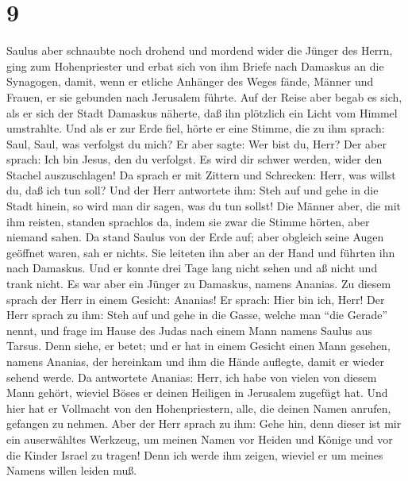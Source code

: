 \hypertarget{section-8}{%
\section{9}\label{section-8}}

 Saulus aber schnaubte noch drohend und mordend wider die
Jünger des Herrn, ging zum Hohenpriester  und erbat sich
von ihm Briefe nach Damaskus an die Synagogen, damit, wenn er etliche
Anhänger des Weges fände, Männer und Frauen, er sie gebunden nach
Jerusalem führte.  Auf der Reise aber begab es sich, als
er sich der Stadt Damaskus näherte, daß ihn plötzlich ein Licht vom
Himmel umstrahlte.  Und als er zur Erde fiel, hörte er
eine Stimme, die zu ihm sprach: Saul, Saul, was verfolgst du mich?
 Er aber sagte: Wer bist du, Herr? Der aber sprach: Ich
bin Jesus, den du verfolgst. Es wird dir schwer werden, wider den
Stachel auszuschlagen!  Da sprach er mit Zittern und
Schrecken: Herr, was willst du, daß ich tun soll? Und der Herr
antwortete ihm: Steh auf und gehe in die Stadt hinein, so wird man dir
sagen, was du tun sollst!  Die Männer aber, die mit ihm
reisten, standen sprachlos da, indem sie zwar die Stimme hörten, aber
niemand sahen.  Da stand Saulus von der Erde auf; aber
obgleich seine Augen geöffnet waren, sah er nichts. Sie leiteten ihn
aber an der Hand und führten ihn nach Damaskus.  Und er
konnte drei Tage lang nicht sehen und aß nicht und trank nicht.
 Es war aber ein Jünger zu Damaskus, namens Ananias. Zu
diesem sprach der Herr in einem Gesicht: Ananias! Er sprach: Hier bin
ich, Herr!  Der Herr sprach zu ihm: Steh auf und gehe in
die Gasse, welche man ``die Gerade'' nennt, und frage im Hause des Judas
nach einem Mann namens Saulus aus Tarsus. Denn siehe, er betet;
 und er hat in einem Gesicht einen Mann gesehen, namens
Ananias, der hereinkam und ihm die Hände auflegte, damit er wieder
sehend werde.  Da antwortete Ananias: Herr, ich habe von
vielen von diesem Mann gehört, wieviel Böses er deinen Heiligen in
Jerusalem zugefügt hat.  Und hier hat er Vollmacht von
den Hohenpriestern, alle, die deinen Namen anrufen, gefangen zu nehmen.
 Aber der Herr sprach zu ihm: Gehe hin, denn dieser ist
mir ein auserwähltes Werkzeug, um meinen Namen vor Heiden und Könige und
vor die Kinder Israel zu tragen!  Denn ich werde ihm
zeigen, wieviel er um meines Namens willen leiden muß. 
